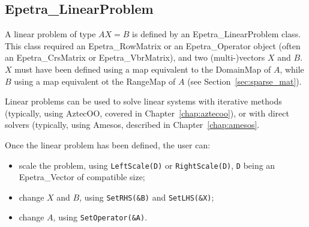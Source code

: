 
\subsection{Epetra\_LinearProblem}
\label{sec:linear_problem}

A linear problem of type $A X = B$ is defined by an
Epetra\_LinearProblem class. This class required an Epetra\_RowMatrix or
an Epetra\_Operator object (often an Epetra\_CrsMatrix or
Epetra\_VbrMatrix), and two (multi-)vectors $X$ and $B$. $X$ must have
been defined using a map equivalent to the DomainMap of $A$, while $B$
using a map equivalent ot the RangeMap of $A$ (see
Section~\ref{sec:sparse_mat}).

Linear problems can be used to solve linear systems with iterative
methods (typically, using AztecOO, covered in
Chapter~\ref{chap:aztecoo}), or with direct solvers (typically, using
Amesos, described in Chapter~\ref{chap:amesos}. 

Once the linear problem has been defined, the user can:

\begin{itemize}
\item scale the problem, using \verb!LeftScale(D)! or
  \verb!RightScale(D)!, \verb!D! being an Epetra\_Vector of compatible
  size;
\item change $X$ and $B$, using \verb!SetRHS(&B)! and \verb!SetLHS(&X)!;
\item change $A$, using \verb!SetOperator(&A)!.
\end{itemize}


